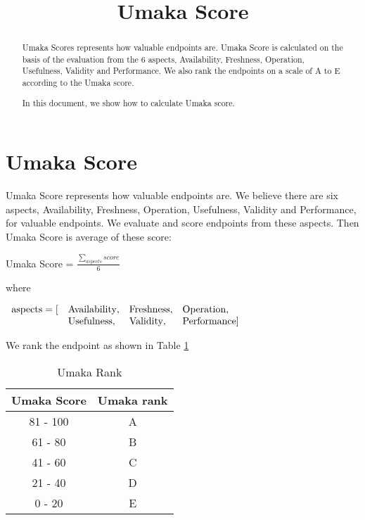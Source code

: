 \documentclass[11pt,a4paper]{article}
\title{Umaka Score}
\begin{document}
\maketitle

\begin{abstract}
Umaka Scores represents how valuable endpoints are.
Umaka Score is calculated on the basis of the evaluation from the 6 aspects, Availability, Freshness, Operation, Usefulness, Validity and Performance.
We also rank the endpoints on a scale of A to E according to the Umaka score.

In this document, we show how to calculate Umaka score.
\end{abstract}

\section{Umaka Score}

Umaka Score represents how valuable endpoints are.
We believe there are six aspects, Availability, Freshness, Operation, Usefulness, Validity and Performance, for  valuable endpoints. We evaluate and score endpoints from these aspects.
Then Umaka Score is average of these score:

\begin{mdframed}
  \center
Umaka Score = $\frac{\displaystyle \sum_{aspects}score}{6}$

where

$\begin{array}{llll}
{\rm aspects} = [ & {\rm Availability}, & {\rm Freshness}, & {\rm Operation}, \\
                  & {\rm Usefulness},   & {\rm Validity},  & {\rm Performance} ]
\end{array}$

\end{mdframed}

We rank the endpoint as shown in Table \ref{table:umaka_rank}

\begin{table}
  \center
  \begin{tabular}{cc}
    \hline
    Umaka Score & Umaka rank \\
    \hline
    81 - 100 & A \\
    61 - 80  & B \\
    41 - 60  & C \\
    21 - 40  & D \\
    0  - 20  & E \\
    \hline
  \end{tabular}
  \caption{Umaka Rank}
  \label{table:umaka_rank}
\end{table}
\end{document}
